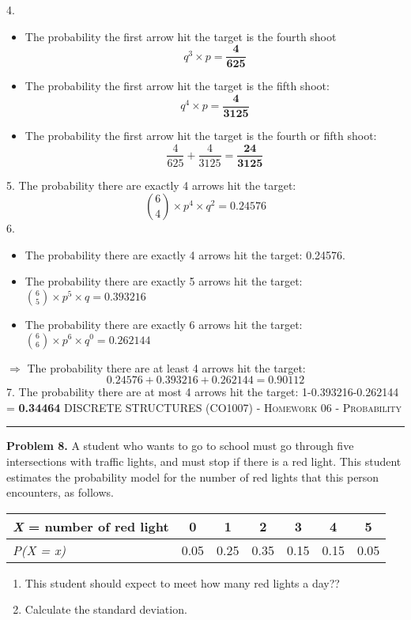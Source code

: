 \documentclass[12pt]{amsart}
\begin{document}
4. 
\begin{itemize}
    \item The probability the first arrow hit the target is the fourth shoot
    \[q^3\times p =\mathbf{\frac{4}{625}}\]
    \item The probability the first arrow hit the target is the fifth shoot:
    \[q^4\times p = \mathbf{\frac{4}{3125}}\]
    \item The probability the first arrow hit the target is the fourth or fifth shoot: 
    \[\frac{4}{625}+\frac{4}{3125}=\mathbf{\frac{24}{3125}}\]
\end{itemize}
5. The probability there are exactly 4 arrows hit the target: 
\[\binom{6}{4}\times p^4 \times q^2=\mathbf{0.24576}\]
6. 
\begin{itemize}
    \item The probability there are exactly 4 arrows hit the target: 0.24576.
    \item The probability there are exactly 5 arrows hit the target:$\displaystyle \binom{6}{5}\times p^5\times q=0.393216$
    \item The probability there are exactly 6 arrows hit the target:$\displaystyle \binom{6}{6}\times p^6 \times q^0=0.262144$
\end{itemize}
$\Rightarrow$ The probability there are at least 4 arrows hit the target: \[0.24576+0.393216+0.262144=\mathbf{0.90112}\]
7. The probability there are at most 4 arrows hit the target: 1-0.393216-0.262144 = \textbf{0.34464}
\newpage
{\scshape } \hfill {\scshape DISCRETE STRUCTURES (CO1007) - Homework 06 - Probability} \hfill {\scshape }
 
\smallskip

\hrule

\bigskip

\bigskip 
\textbf{Problem 8. }A student who wants to go to school must go through five intersections with traffic lights,
and must stop if there is a red light. This student estimates the probability model for the number of red
lights that this person encounters, as follows.
\bigskip

\begin{tabular}{|l|l|l|l|l|l|l|}
\hline
\textit{X }= number of red light &
  \multicolumn{1}{c|}{0} &
  \multicolumn{1}{c|}{1} &
  \multicolumn{1}{c|}{2} &
  \multicolumn{1}{c|}{3} &
  \multicolumn{1}{c|}{4} &
  \multicolumn{1}{c|}{5} \\ \hline
\textit{P(X = x)} &
  0.05 &
  0.25 &
  0.35 &
  0.15 &
  0.15 &
  0.05 \\ \hline
\end{tabular}
\begin{enumerate}
    \item This student should expect to meet how many red lights a day??
    \item Calculate the standard deviation.
\end{enumerate}
\bigskip
\end{document}
